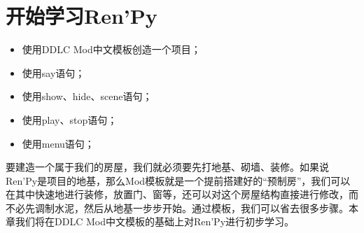 \documentclass[../../Main.tex]{subfiles}
\begin{document}
\chapter{开始学习Ren'Py}

\begin{ChapterGoals}
    \begin{itemize}
        \item 使用DDLC Mod中文模板创造一个项目；
        \item 使用say语句；
        \item 使用show、hide、scene语句；
        \item 使用play、stop语句；
        \item 使用menu语句；
    \end{itemize}
\end{ChapterGoals}

要建造一个属于我们的房屋，我们就必须要先打地基、砌墙、装修。如果说Ren'Py是项目的地基，那么Mod模板就是一个提前搭建好的“预制房”，我们可以在其中快速地进行装修，放置门、窗等，还可以对这个房屋结构直接进行修改，而不必先调制水泥，然后从地基一步步开始。通过模板，我们可以省去很多步骤。本章我们将在DDLC Mod中文模板的基础上对Ren'Py进行初步学习。


\end{document}
